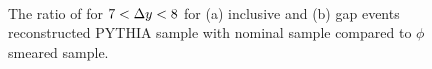 \begin{figure}
\centering
\mbox{
              \quad
              \quad
                              }
\caption[Uncertainty bands due to the jet $\phi$ resolution for \dphiDist{} for $7<\dy{}<8$]{
The ratio of \dphiDist{} for $7<\dy{}<8$ for (a) inclusive and (b) gap events reconstructed PYTHIA sample with nominal sample compared to $\phi$ smeared sample.
\label{GBJ2:ResoPhi:dphi78}}
\end{figure}


